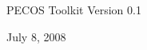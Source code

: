 \thispagestyle{empty}

\begin{center}

$~$

\vspace{1.5in}

PECOS Toolkit Version 0.1

July 8, 2008

\clearpage
{}
\tableofcontents

\end{center}
